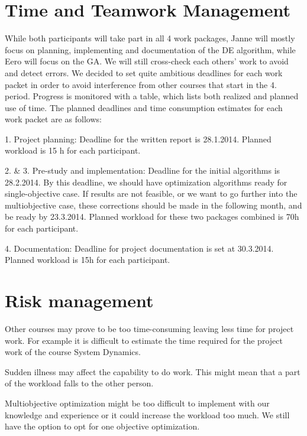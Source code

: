\documentclass[twoside]{article}
\begin{document}
\begin{multicols}{2}

\section{Time and Teamwork Management}

While both participants will take part in all 4 work packages, Janne will mostly focus on planning, implementing and documentation of the DE algorithm, while Eero will focus on the GA. We will still cross-check each others' work to avoid and detect errors. We decided to set quite ambitious deadlines for each work packet in order to avoid interference from other courses that start in the 4. period. Progress is monitored with a table, which lists both realized and planned use of time. The planned deadlines and time consumption estimates for each work packet are as follows:

1. Project planning:
Deadline for the written report is 28.1.2014. Planned workload is 15 h for each participant.

2. \& 3. Pre-study and implementation:
Deadline for the initial algorithms is 28.2.2014. By this deadline, we should have optimization algorithms ready for single-objective case. If results are not feasible, or we want to go further into the multiobjective case, these corrections should be made in the following month, and be ready by 23.3.2014. Planned workload for these two packages combined is 70h for each participant.

4. Documentation:
Deadline for project documentation is set at 30.3.2014. Planned workload is 15h for each participant.







\section{Risk management}
Other courses may prove to be too time-consuming leaving less time for project work. For example it is difficult to estimate the time required for the project work of the course System Dynamics.

Sudden illness may affect the capability to do work. This might mean that a part of the workload falls to the other person.

Multiobjective optimization might be too difficult to implement with our knowledge and experience or it could increase the workload too much. We still have the option to opt for one objective optimization.


\end{multicols}
\end{document}
